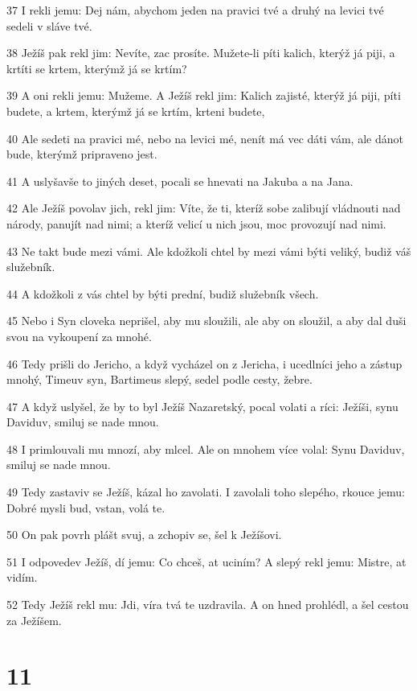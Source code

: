 \par 37 I rekli jemu: Dej nám, abychom jeden na pravici tvé a druhý na levici tvé sedeli v sláve tvé.
\par 38 Ježíš pak rekl jim: Nevíte, zac prosíte. Mužete-li píti kalich, kterýž já piji, a krtíti se krtem, kterýmž já se krtím?
\par 39 A oni rekli jemu: Mužeme. A Ježíš rekl jim: Kalich zajisté, kterýž já piji, píti budete, a krtem, kterýmž já se krtím, krteni budete,
\par 40 Ale sedeti na pravici mé, nebo na levici mé, nenít má vec dáti vám, ale dánot bude, kterýmž pripraveno jest.
\par 41 A uslyšavše to jiných deset, pocali se hnevati na Jakuba a na Jana.
\par 42 Ale Ježíš povolav jich, rekl jim: Víte, že ti, kteríž sobe zalibují vládnouti nad národy, panujít nad nimi; a kteríž velicí u nich jsou, moc provozují nad nimi.
\par 43 Ne takt bude mezi vámi. Ale kdožkoli chtel by mezi vámi býti veliký, budiž váš služebník.
\par 44 A kdožkoli z vás chtel by býti prední, budiž služebník všech.
\par 45 Nebo i Syn cloveka neprišel, aby mu sloužili, ale aby on sloužil, a aby dal duši svou na vykoupení za mnohé.
\par 46 Tedy prišli do Jericho, a když vycházel on z Jericha, i ucedlníci jeho a zástup mnohý, Timeuv syn, Bartimeus slepý, sedel podle cesty, žebre.
\par 47 A když uslyšel, že by to byl Ježíš Nazaretský, pocal volati a ríci: Ježíši, synu Daviduv, smiluj se nade mnou.
\par 48 I primlouvali mu mnozí, aby mlcel. Ale on mnohem více volal: Synu Daviduv, smiluj se nade mnou.
\par 49 Tedy zastaviv se Ježíš, kázal ho zavolati. I zavolali toho slepého, rkouce jemu: Dobré mysli bud, vstan, volá te.
\par 50 On pak povrh plášt svuj, a zchopiv se, šel k Ježíšovi.
\par 51 I odpovedev Ježíš, dí jemu: Co chceš, at uciním? A slepý rekl jemu: Mistre, at vidím.
\par 52 Tedy Ježíš rekl mu: Jdi, víra tvá te uzdravila. A on hned prohlédl, a šel cestou za Ježíšem.

\chapter{11}

